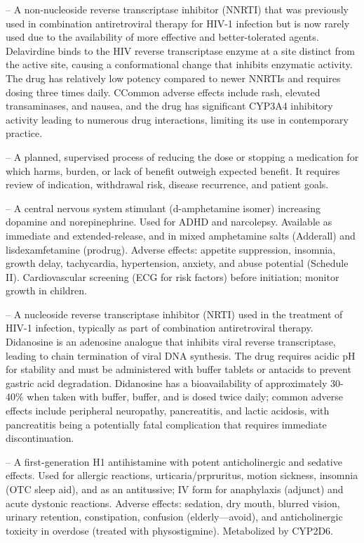 -- A non-nucleoside reverse transcriptase inhibitor (NNRTI) that was previously used in combination antiretroviral therapy for HIV-1 infection but is now rarely used due to the availability of more effective and better-tolerated agents. Delavirdine binds to the HIV reverse transcriptase enzyme at a site distinct from the active site, causing a conformational change that inhibits enzymatic activity. The drug has relatively low potency compared to newer NNRTIs and requires dosing three times daily. CCommon adverse effects include rash, elevated transaminases, and nausea, and the drug has significant CYP3A4 inhibitory activity leading to numerous drug interactions, limiting its use in contemporary practice.

-- A planned, supervised process of reducing the dose or stopping a medication for which harms, burden, or lack of benefit outweigh expected benefit. It requires review of indication, withdrawal risk, disease recurrence, and patient goals.

-- A central nervous system stimulant (d-amphetamine isomer) increasing dopamine and norepinephrine. Used for ADHD and narcolepsy. Available as immediate and extended-release, and in mixed amphetamine salts (Adderall) and lisdexamfetamine (prodrug). Adverse effects: appetite suppression, insomnia, growth delay, tachycardia, hypertension, anxiety, and abuse potential (Schedule II). Cardiovascular screening (ECG for risk factors) before initiation; monitor growth in children.

-- A nucleoside reverse transcriptase inhibitor (NRTI) used in the treatment of HIV-1 infection, typically as part of combination antiretroviral therapy. Didanosine is an adenosine analogue that inhibits viral reverse transcriptase, leading to chain termination of viral DNA synthesis. The drug requires acidic pH for stability and must be administered with buffer tablets or antacids to prevent gastric acid degradation. Didanosine has a bioavailability of approximately 30-40\% when taken with buffer, buffer, and is dosed twice daily; common adverse effects include peripheral neuropathy, pancreatitis, and lactic acidosis, with pancreatitis being a potentially fatal complication that requires immediate discontinuation.

-- A first-generation H1 antihistamine with potent anticholinergic and sedative effects. Used for allergic reactions, urticaria/prpruritus, motion sickness, insomnia (OTC sleep aid), and as an antitussive; IV form for anaphylaxis (adjunct) and acute dystonic reactions. Adverse effects: sedation, dry mouth, blurred vision, urinary retention, constipation, confusion (elderly—avoid), and anticholinergic toxicity in overdose (treated with physostigmine). Metabolized by CYP2D6.

